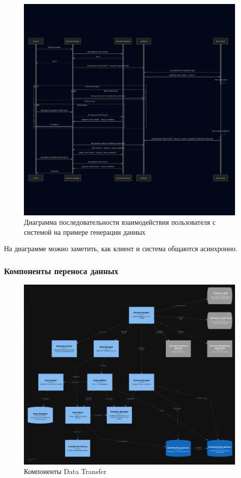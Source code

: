 \begin{figure}
  \includegraphics[scale=0.26]{./img/mermaid-sequence-User-MainSystem.png}
  \caption{Диаграмма последовательности взаимодействия пользователя с системой на примере генерации данных}
  \label{Sequence User-MainSystem}
\end{figure}

На диаграмме можно заметить, как клиент и система общаются асинхронно.

\subsubsection{Компоненты переноса данных}

\begin{figure}
  \includegraphics[scale=0.12]{./img/structurizr-DataTransferComponents.png}
  \caption{Компоненты Data Transfer}
  \label{Data Transfer Components}
\end{figure}

